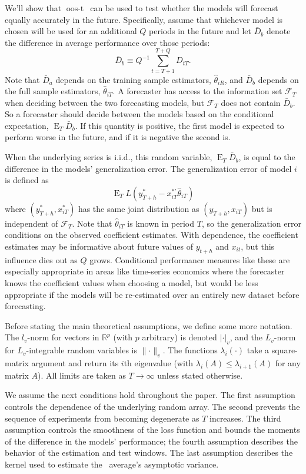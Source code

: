 \documentclass[11pt]{article}
\DeclareMathOperator{\E}{E}
\newcommand{\oosA}{\bar{D}_a}
\newcommand{\oosB}{\bar{D}_b}
\newcommand{\oost}{\ensuremath{\operatorname{oos-t}}}
\newcommand{\h}{h}
\renewcommand{\Re}{\ensuremath{\mathbb{R}}}
\begin{document}
We'll show that \oost\ can be used to test whether the models will
forecast equally accurately in the future.  Specifically, assume that
whichever model is chosen will be used for an additional $Q$ periods
in the future and let $\oosB$ denote the difference in average
performance over those periods:
\[
\oosB \equiv Q^{-1} \sum_{t=T+1}^{T+Q} D_{tT}.
\]
Note that $\oosA$ depends on the training sample estimators,
$\hat\theta_{iR}$, and $\oosB$ depends on the full sample
estimators, $\hat\theta_{iT}$.  A forecaster has access to the
information set $\mathcal{F}_T$ when deciding between the two
forecasting models, but $\mathcal{F}_T$ does not contain $\oosB$.
So a forecaster should decide between the models based on the
conditional expectation, $\E_T \oosB$. If this quantity is
positive, the first model is expected to perform worse in the future,
and if it is negative the second is.

When the underlying series is i.i.d., this random variable, $\E_T
\oosB$, is equal to the difference in the models' generalization
error.  The generalization error of model $i$ is defined as
\begin{equation*}
  \E_{T} L(y_{T+\h}^{*} - x_{iT}^{*\prime}\hat{\theta}_{iT})
\end{equation*}
where $(y_{T+\h}^{*},x_{iT}^{*})$ has the same joint distribution as
$(y_{T+\h}, x_{iT})$ but is independent of $\mathcal{F}_T$.  Note that
$\hat{\theta}_{iT}$ is known in period $T$, so the generalization
error conditions on the observed coefficient estimates.  With
dependence, the coefficient estimates may be informative about future
values of $y_{t+\h}$ and $x_{it}$, but this influence dies out as $Q$
grows.  Conditional performance measures like these are especially
appropriate in areas like time-series economics where the forecaster
knows the coefficient values when choosing a model, but would be less
appropriate if the models will be re-estimated over an entirely new
dataset before forecasting.

Before stating the main theoretical assumptions, we define some more
notation.  The $l_v$-norm for vectors in $\Re^p$ (with $p$ arbitrary)
is denoted $\lvert \cdot \rvert_v$, and the $L_v$-norm for
$L_v$-integrable random variables is $\lVert \cdot \rVert_v$.  The
functions $\lambda_i(\cdot)$ take a square-matrix argument and return
its $i$th eigenvalue (with $\lambda_{i}(A) \leq \lambda_{i+1}(A)$ for
any matrix $A$).
All limits are taken as $T \to \infty$ unless stated otherwise.
 
We assume the next conditions hold throughout the paper.  The first
assumption controls the dependence of the underlying random array.
The second prevents the sequence of experiments from becoming
degenerate as $T$ increases.  The third assumption controls the
smoothness of the loss function and bounds the moments of the
difference in the models' performance; the fourth assumption describes
the behavior of the estimation and test windows.  The last assumption
describes the kernel used to estimate the \oos\ average's asymptotic
variance.
\end{document}
